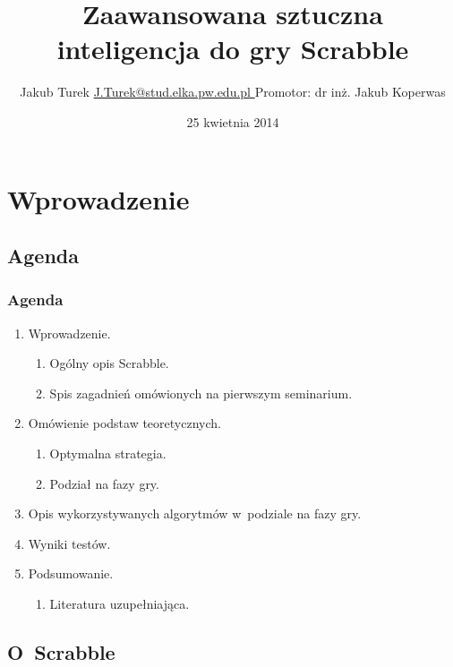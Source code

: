 \documentclass[10pt,a4paper]{beamer}
\author[Jakub Turek]{\texorpdfstring{Jakub Turek \newline \href{mailto:J.Turek@stud.elka.pw.edu.pl}{ J.Turek@stud.elka.pw.edu.pl }}{Jakub Turek} \newline \vskip2pt {\small Promotor: dr inż. Jakub Koperwas}}
\title{Zaawansowana sztuczna inteligencja do gry Scrabble}
\institute{Wydział Elektroniki i~Technik Informacyjnych}
\date{25 kwietnia 2014}
\begin{document}
\begin{frame}
	\titlepage
\end{frame}

\section{Wprowadzenie}
\subsection{Agenda}

\begin{frame}
	\frametitle{Agenda}

	\begin{enumerate}
		\item Wprowadzenie.
			\begin{enumerate}
				\item Ogólny opis Scrabble.
				\item Spis zagadnień omówionych na pierwszym seminarium.
			\end{enumerate}
		\item Omówienie podstaw teoretycznych.
			\begin{enumerate}
				\item Optymalna strategia.
				\item Podział na fazy gry.
			\end{enumerate}
		\item Opis wykorzystywanych algorytmów w~podziale na fazy gry.
		\item Wyniki testów.
		\item Podsumowanie.
			\begin{enumerate}
				\item Literatura uzupełniająca.
 			\end{enumerate}
	\end{enumerate}
\end{frame}

\subsection{O~Scrabble}
\end{document}
